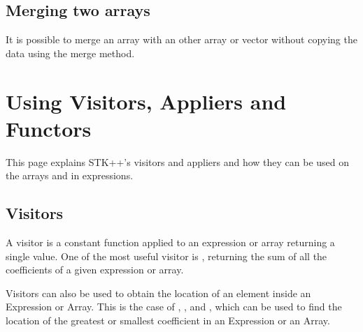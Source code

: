 \documentclass[a4paper,10pt]{article}
\begin{document}
\begin{minipage}[t]{0.5\textwidth}

\end{minipage}
\hspace{0.2cm}
\begin{minipage}[t]{0.5\textwidth}
\addtocounter{lstlisting}{-1}

\end{minipage}

\subsection{Merging two arrays}

It is possible to merge an array with an other array or vector without
copying the data using the merge method.

\begin{minipage}[t]{0.66\textwidth}

\end{minipage}
\hspace{0.2cm}
\begin{minipage}[t]{0.33\textwidth}
\addtocounter{lstlisting}{-1}

\end{minipage}

\section{Using Visitors, Appliers and Functors}

This page explains STK++'s visitors and appliers and how they
can be used on the arrays and in expressions.

\subsection{Visitors}

A visitor is a constant function applied to an expression or array
returning a single value. One of the most useful visitor is ,
returning the sum of all the coefficients of a given expression or array.

Visitors can also be used to obtain the location of an element
inside an Expression or Array. This is the case of ,
,  and ,
which can be used to find the location of the greatest or smallest coefficient in
an Expression or an Array.
\end{document}
